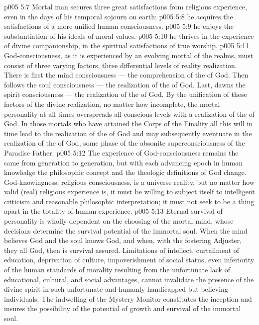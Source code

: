\vs p005 5:7 \pc Mortal man secures three great satisfactions from religious experience, even in the days of his temporal sojourn on earth:
\vs p005 5:8 \bibnobreakspace {} he acquires the satisfactions of a more unified human consciousness.
\vs p005 5:9 \bibnobreakspace {} he enjoys the substantiation of his ideals of moral values.
\vs p005 5:10 \bibnobreakspace {} he thrives in the experience of divine companionship, in the spiritual satisfactions of true worship.
\vs p005 5:11 \pc God\hyp{}consciousness, as it is experienced by an evolving mortal of the realms, must consist of three varying factors, three differential levels of reality realization. There is first the mind consciousness --- the comprehension of the  of God. Then follows the soul consciousness --- the realization of the  of God. Last, dawns the spirit consciousness --- the realization of the  of God. By the unification of these factors of the divine realization, no matter how incomplete, the mortal personality at all times overspreads all conscious levels with a realization of the  of God. In those mortals who have attained the Corps of the Finality all this will in time lead to the realization of the  of God and may subsequently eventuate in the realization of the  of God, some phase of the absonite superconsciousness of the Paradise Father.
\vs p005 5:12 The experience of God\hyp{}consciousness remains the same from generation to generation, but with each advancing epoch in human knowledge the philosophic concept and the theologic definitions of God  change. God\hyp{}knowingness, religious consciousness, is a universe reality, but no matter how valid (real) religious experience is, it must be willing to subject itself to intelligent criticism and reasonable philosophic interpretation; it must not seek to be a thing apart in the totality of human experience.
\vs p005 5:13 \pc Eternal survival of personality is wholly dependent on the choosing of the mortal mind, whose decisions determine the survival potential of the immortal soul. When the mind believes God and the soul knows God, and when, with the fostering Adjuster, they all  God, then is survival assured. Limitations of intellect, curtailment of education, deprivation of culture, impoverishment of social status, even inferiority of the human standards of morality resulting from the unfortunate lack of educational, cultural, and social advantages, cannot invalidate the presence of the divine spirit in such unfortunate and humanly handicapped but believing individuals. The indwelling of the Mystery Monitor constitutes the inception and insures the possibility of the potential of growth and survival of the immortal soul.
